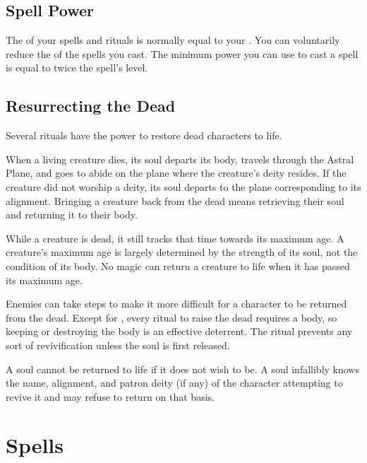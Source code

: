     \subsection{Spell Power}

        The  of your spells and rituals is normally equal to your .
        You can voluntarily reduce the  of the spells you cast.
        The minimum power you can use to cast a spell is equal to twice the spell's level.

    \subsection{Resurrecting the Dead}\label{Resurrecting the Dead}
        Several rituals have the power to restore dead characters to life.

        When a living creature dies, its soul departs its body, travels through the Astral Plane, and goes to abide on the plane where the creature's deity resides.
        If the creature did not worship a deity, its soul departs to the plane corresponding to its alignment.
        Bringing a creature back from the dead means retrieving their soul and returning it to their body.

         While a creature is dead, it still tracks that time towards its maximum age.
        A creature's maximum age is largely determined by the strength of its soul, not the condition of its body.
        No magic can return a creature to life when it has passed its maximum age.

         Enemies can take steps to make it more difficult for a character to be returned from the dead.
        Except for , every ritual to raise the dead requires a body, so keeping or destroying the body is an effective deterrent.
        The  ritual prevents any sort of revivification unless the soul is first released.

         A soul cannot be returned to life if it does not wish to be.
        A soul infallibly knows the name, alignment, and patron deity (if any) of the character attempting to revive it and may refuse to return on that basis.

\section{Spells}\label{Spells}

